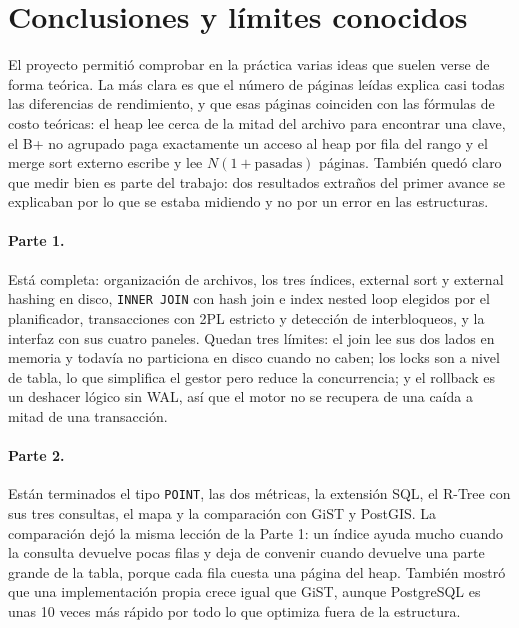 \documentclass[11pt,a4paper]{article}
\begin{document}
\section{Conclusiones y límites conocidos}
\label{sec:pendiente}

El proyecto permitió comprobar en la práctica varias ideas que suelen verse de forma teórica. La más clara es que el número de páginas leídas explica casi todas las diferencias de rendimiento, y que esas páginas coinciden con las fórmulas de costo teóricas: el heap lee cerca de la mitad del archivo para encontrar una clave, el B+ no agrupado paga exactamente un acceso al heap por fila del rango y el merge sort externo escribe y lee $N(1 + \text{pasadas})$ páginas. También quedó claro que medir bien es parte del trabajo: dos resultados extraños del primer avance se explicaban por lo que se estaba midiendo y no por un error en las estructuras.

\paragraph{Parte 1.} Está completa: organización de archivos, los tres índices, external sort y external hashing en disco, \texttt{INNER JOIN} con hash join e index nested loop elegidos por el planificador, transacciones con 2PL estricto y detección de interbloqueos, y la interfaz con sus cuatro paneles. Quedan tres límites: el join lee sus dos lados en memoria y todavía no particiona en disco cuando no caben; los locks son a nivel de tabla, lo que simplifica el gestor pero reduce la concurrencia; y el rollback es un deshacer lógico sin WAL, así que el motor no se recupera de una caída a mitad de una transacción.

\paragraph{Parte 2.} Están terminados el tipo \texttt{POINT}, las dos métricas, la extensión SQL, el R-Tree con sus tres consultas, el mapa y la comparación con GiST y PostGIS. La comparación dejó la misma lección de la Parte 1: un índice ayuda mucho cuando la consulta devuelve pocas filas y deja de convenir cuando devuelve una parte grande de la tabla, porque cada fila cuesta una página del heap. También mostró que una implementación propia crece igual que GiST, aunque PostgreSQL es unas 10 veces más rápido por todo lo que optimiza fuera de la estructura.
\end{document}
